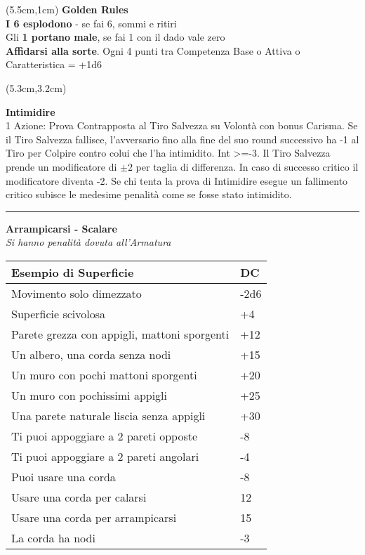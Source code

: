 \documentclass[a4paper,12 pt,openany]{book}
\newcommand{\riga}{\rule{\textwidth}{0.4pt}}
\begin{document}
\begin{textblock*}{14.5cm}(5.5cm,1cm) %
\textbf{Golden Rules}\\

{\textbf{I 6 esplodono}} - se fai 6, sommi e ritiri\\
Gli \textbf{1 portano male}, se fai 1 con il dado vale zero\\
\textbf{Affidarsi alla sorte}. Ogni 4 punti tra Competenza Base o Attiva o Caratteristica = +1d6\\
\end{textblock*}


\begin{textblock*}{7.4cm}(5.3cm,3.2cm) %

\textbf{Intimidire}\\
1 Azione: Prova Contrapposta al Tiro Salvezza su Volontà con bonus Carisma.
Se il Tiro Salvezza fallisce, l'avversario fino alla fine del suo round successivo ha -1 al Tiro per Colpire contro colui che l'ha intimidito. Int >=-3. Il Tiro Salvezza prende un modificatore di $\pm2$ per taglia di differenza. In caso di successo critico il modificatore diventa -2.  Se chi tenta la prova di Intimidire esegue un fallimento critico subisce le medesime penalità come se fosse stato intimidito.

\riga

\textbf{Arrampicarsi - Scalare}\\
\textit{Si hanno penalità dovuta all'Armatura}

\noindent\begin{tabularx}{1\textwidth}{Xl}
	\textbf{Esempio di Superficie} & \textbf{DC}\\
\hline
	Movimento solo dimezzato & -2d6\\
	Superficie scivolosa&+4\\
	{\small Parete grezza con appigli, mattoni sporgenti}&+12\\
	Un albero, una corda senza nodi&+15\\
	Un muro con pochi mattoni sporgenti &+20\\
	Un muro con pochissimi appigli&+25\\
	Una parete naturale liscia senza appigli&+30\\
	Ti puoi appoggiare a 2 pareti opposte&-8\\
	Ti puoi appoggiare a 2 pareti angolari&-4\\
	Puoi usare una corda&-8\\
	\hline
	Usare una corda per calarsi&12\\
	Usare una corda per arrampicarsi&15\\
	La corda ha nodi & -3\\
\end{tabularx}


\end{textblock*}
\end{document}
